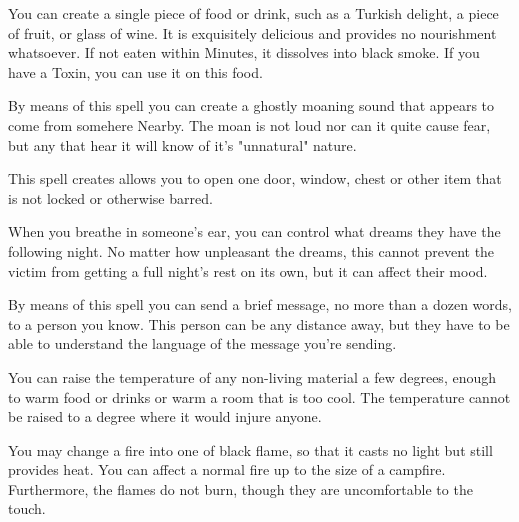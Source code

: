 {

You can create a single piece of food or drink, such as a Turkish delight, a piece of fruit, or glass of wine. It is exquisitely delicious and provides no nourishment whatsoever. If not eaten within Minutes, it dissolves into black smoke.  If you have a Toxin, you can use it on this food.


By means of this spell you can create a ghostly moaning sound that appears to come from somehere Nearby. The moan is not loud nor can it quite cause fear, but any that hear it will know of it's "unnatural" nature. 


This spell creates allows you to open one door, window, chest or other item that is not locked or otherwise barred. 


When you breathe in someone's ear, you can control what dreams they have the following night. No matter how unpleasant the dreams, this cannot prevent the victim from getting a full night’s rest on its own, but it can affect their mood.


By means of this spell you can send a brief message, no more than a dozen words, to a person you know. This person can be any distance away, but they have to be able to understand the language of the message you're sending.


You can raise  the temperature of any non-living material a few degrees, enough to warm food or drinks or warm a room that is too cool.  The temperature cannot be raised to a degree where it would injure anyone.



You may change a fire into one of black flame, so that it casts no light but still provides heat.  You can affect a normal fire up to the size of a campfire.  Furthermore, the flames do not burn, though they are uncomfortable to the touch.


}
